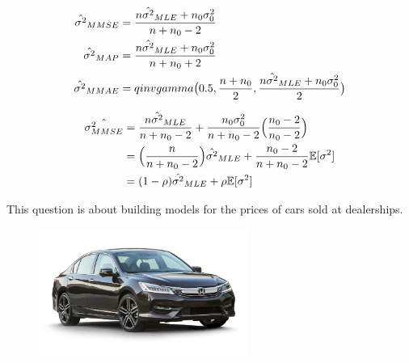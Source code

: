 \documentclass[12pt]{article}
\begin{document}
\begin{enumerate}

\begin{align*}
    \hat{\sigma^2}_{MMSE} &= \frac{ n \hat{\sigma^2}_{MLE} + n_0 \sigma^2_0 }{ n + n_0 - 2}\\
    \hat{\sigma^2}_{MAP} &= \frac{ n \hat{\sigma^2}_{MLE} + n_0 \sigma^2_0 }{ n + n_0 + 2}\\
    \hat{\sigma^2}_{MMAE} &= qinvgamma \big(0.5, \frac{ n + n_0}{2}, \frac{n \hat{\sigma^2}_{MLE} + n_0 \sigma^2_0 }{2}\big)
\end{align*}


\begin{align*}
    \hat{\sigma^2_{MMSE}} 
        &= \frac{ n \hat{\sigma^2}_{MLE} }{ n + n_0 - 2} + \frac{ n_0 \sigma^2_0 }{ n + n_0 - 2} \Big(\frac{n_0 - 2}{n_0 - 2}\Big)\\
        &= \Big(\frac{n}{n+n_0-2}\Big)\hat{\sigma^2}_{MLE} + \frac{n_0-2}{n+n_0-2} \mathbb{E}[\sigma^2]\\
        &= (1-\rho)\hat{\sigma^2}_{MLE} + \rho \mathbb{E}[\sigma^2]
    \end{align*}



\end{enumerate}




\problem This question is about building models for the prices of cars sold at dealerships.

\begin{figure}[htp]
\centering
\includegraphics[width=2.7in]{accord.jpg}
\end{figure}
\end{document}
